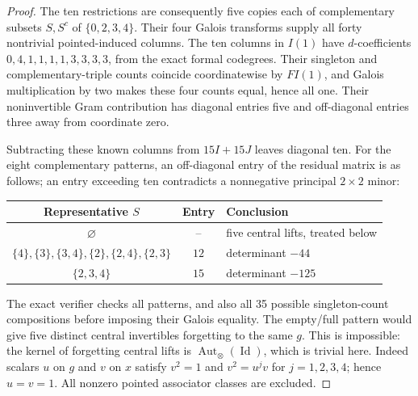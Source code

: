 \begin{proof}
The ten restrictions are consequently five copies each of complementary
subsets $S,S^c$ of $\{0,2,3,4\}$. Their four Galois transforms supply
all forty nontrivial pointed-induced columns. The ten columns in $I(1)$
have $d$-coefficients $0,4,1,1,1,1,3,3,3,3$, from the exact formal
codegrees. Their singleton and complementary-triple counts coincide
coordinatewise by $FI(1)$, and Galois multiplication by two makes these
four counts equal, hence all one. Their noninvertible Gram contribution
has diagonal entries five and off-diagonal entries three away from
coordinate zero.

Subtracting these known columns from $15I+15J$ leaves diagonal ten.
For the eight complementary patterns, an off-diagonal entry of the
residual matrix is as follows; an entry exceeding ten contradicts a
nonnegative principal $2\times2$ minor:
\begin{center}\begin{tabular}{ccl}
\toprule Representative $S$ & Entry & Conclusion\\\midrule
$\varnothing$ & -- & five central lifts, treated below\\
$\{4\},\{3\},\{3,4\},\{2\},\{2,4\},\{2,3\}$ & $12$ & determinant $-44$\\
$\{2,3,4\}$ & $15$ & determinant $-125$\\\bottomrule
\end{tabular}\end{center}
The exact verifier checks all patterns, and also all 35 possible
singleton-count compositions before imposing their Galois equality.
The empty/full pattern would give five distinct central invertibles
forgetting to the same $g$. This is impossible: the kernel of forgetting
central lifts is $\operatorname{Aut}_{\otimes}(\operatorname{Id})$,
which is trivial here. Indeed scalars $u$ on $g$ and $v$ on $x$ satisfy
$v^2=1$ and $v^2=u^jv$ for $j=1,2,3,4$; hence $u=v=1$.
All nonzero pointed associator classes are excluded.
\end{proof}

